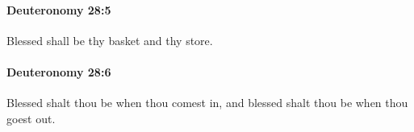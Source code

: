 		\paragraph{Deuteronomy 28:5} %
			\label{DEUTERONOMY-28-5}

			Blessed shall be thy basket and thy store.


		\paragraph{Deuteronomy 28:6} %
			\label{DEUTERONOMY-28-6}

			Blessed shalt thou be when thou comest in, and blessed shalt thou be when thou goest out.


